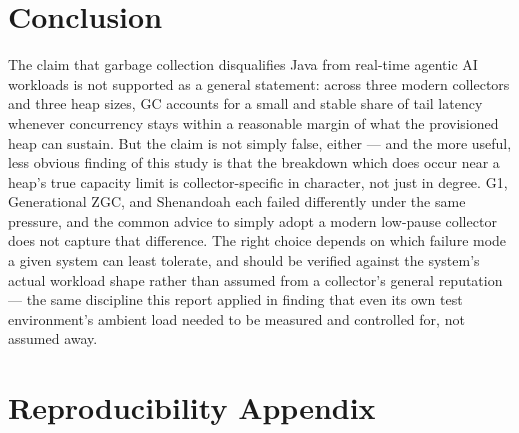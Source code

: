 \documentclass[11pt]{article}
\begin{document}
\section{Conclusion}

The claim that garbage collection disqualifies Java from real-time agentic AI workloads is not
supported as a general statement: across three modern collectors and three heap sizes, GC
accounts for a small and stable share of tail latency whenever concurrency stays within a
reasonable margin of what the provisioned heap can sustain. But the claim is not simply false,
either --- and the more useful, less obvious finding of this study is that the breakdown which
does occur near a heap's true capacity limit is collector-specific in character, not just in
degree. G1, Generational ZGC, and Shenandoah each failed differently under the same pressure, and
the common advice to simply adopt a modern low-pause collector does not capture that difference.
The right choice depends on which failure mode a given system can least tolerate, and should be
verified against the system's actual workload shape rather than assumed from a collector's
general reputation --- the same discipline this report applied in finding that even its own test
environment's ambient load needed to be measured and controlled for, not assumed away.

\section{Reproducibility Appendix}
\end{document}
